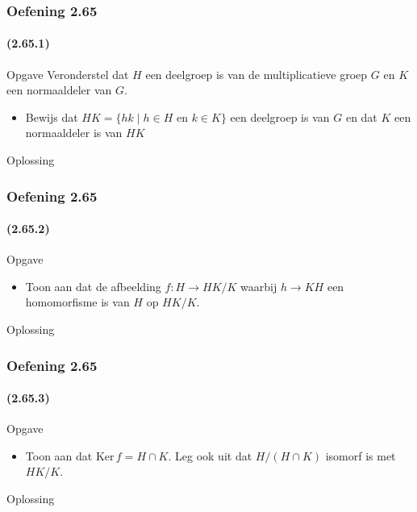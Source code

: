 \documentclass[10pt]{beamer}
\begin{document}
\begin{frame}
	\frametitle{Oefening 2.65}
	\framesubtitle{(2.65.1)}
	\begin{block}{Opgave}
		Veronderstel dat $H$ een deelgroep is van de multiplicatieve groep $G$ 
		en $K$ een normaaldeler van $G$.
		\begin{itemize}
			\item Bewijs dat $HK = \lbrace hk \mid h \in H 
			\text{ en } k \in K\rbrace$ een deelgroep is van $G$ 
			en dat $K$ een normaaldeler is van $HK$
		\end{itemize}
	\end{block}
	\begin{block}{Oplossing}
		
	\end{block}
\end{frame}
\begin{frame}
	\frametitle{Oefening 2.65}
	\framesubtitle{(2.65.2)}
	\begin{block}{Opgave}
		\begin{itemize}
			\item Toon aan dat de afbeelding $f : H \rightarrow HK/K$
			waarbij $h \rightarrow KH$ een homomorfisme is 
			van $H$ op $HK/K$.
		\end{itemize}
	\end{block}
	\begin{block}{Oplossing}
		
	\end{block}
\end{frame}
\begin{frame}
	\frametitle{Oefening 2.65}
	\framesubtitle{(2.65.3)}
	\begin{block}{Opgave}
		\begin{itemize}
			\item Toon aan dat $\text{Ker}\,f = H \cap K$. Leg ook uit dat 
			$H/(H \cap K)$ isomorf is met $HK/K$.
		\end{itemize}
	\end{block}
	\begin{block}{Oplossing}
		
	\end{block}
\end{frame}
\end{document}
